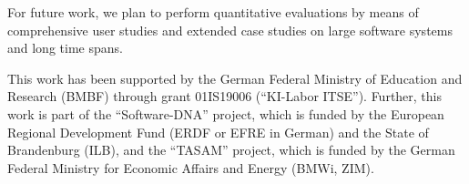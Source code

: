 \documentclass[sigconf%
,natbib=true%
]{acmart}
\begin{document}
For future work, we plan to perform quantitative evaluations by means of comprehensive user studies and extended case studies on large software systems and long time spans.

\begin{acks}
    This work has been supported by the German Federal Ministry of Education and Research (BMBF) through grant 01IS19006  (\enquote{KI-Labor ITSE}).
    Further, this work is part of the \enquote{Software-DNA} project, which is funded by the European Regional Development Fund (ERDF or EFRE in German) and the State of Brandenburg (ILB), and the \enquote{TASAM} project, which is funded by the German Federal Ministry for Economic Affairs and Energy (BMWi, ZIM).
\end{acks}



\end{document}
